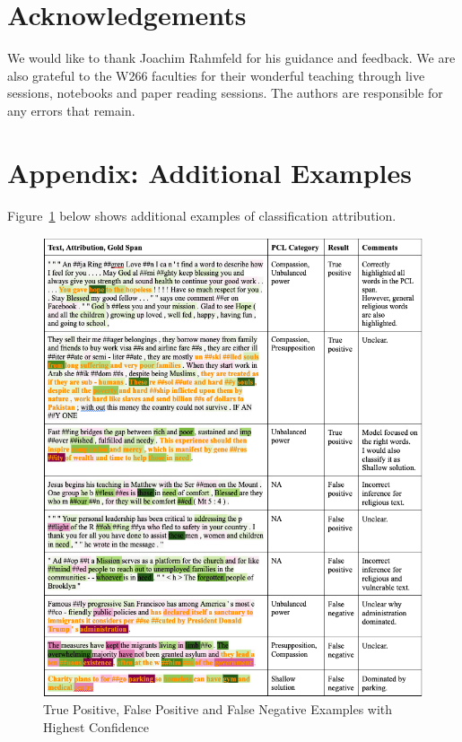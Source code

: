 \documentclass[11pt]{article}
\begin{document}
\section*{Acknowledgements}

We would like to thank Joachim Rahmfeld for his guidance and feedback. We are also grateful to the W266 faculties for their wonderful teaching through live sessions, notebooks and paper reading sessions. The authors are responsible for any errors that remain.



\appendix

\section*{Appendix: Additional Examples}
Figure~\ref{fig:fig2} below shows additional examples of classification attribution. 

\label{sec:appendix}

\begin{figure}[t]
    \centering
    \includegraphics[width=16cm]{Fig 2.png}
    \caption{True Positive, False Positive and False Negative Examples with Highest Confidence}
    \label{fig:fig2}
\end{figure}
\end{document}
